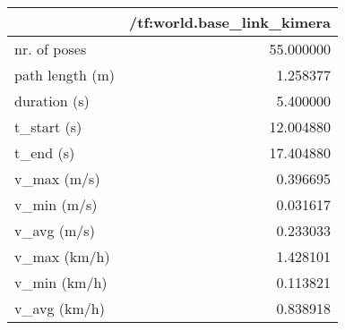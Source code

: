 \begin{tabular}{lr}
\toprule
{} &  /tf:world.base\_link\_kimera \\
\midrule
nr. of poses    &                   55.000000 \\
path length (m) &                    1.258377 \\
duration (s)    &                    5.400000 \\
t\_start (s)     &                   12.004880 \\
t\_end (s)       &                   17.404880 \\
v\_max (m/s)     &                    0.396695 \\
v\_min (m/s)     &                    0.031617 \\
v\_avg (m/s)     &                    0.233033 \\
v\_max (km/h)    &                    1.428101 \\
v\_min (km/h)    &                    0.113821 \\
v\_avg (km/h)    &                    0.838918 \\
\bottomrule
\end{tabular}
